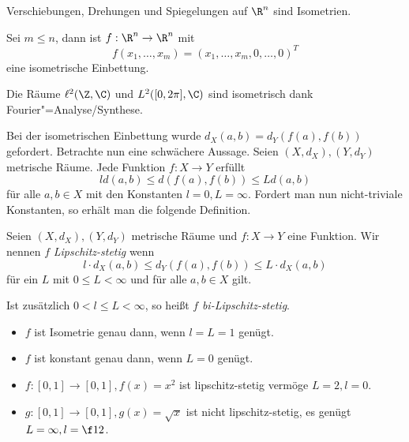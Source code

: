 \begin{ex}
	Verschiebungen, Drehungen und Spiegelungen auf $\R^n$ sind Isometrien.
\end{ex}

\begin{ex}
	Sei $m \le n$, dann ist	$f: \R^n \to \R^n$ mit
	\[
		f(x_1, \dotsc, x_m) = (x_1, \dotsc, x_m, 0, \dotsc, 0)^T
	\]
	eine isometrische Einbettung.
\end{ex}

\begin{ex}
	Die Räume $\ell^2(\Z, \C)$ und $L^2([0,2\pi], \C)$ sind isometrisch dank Fourier"=Analyse/Synthese.
\end{ex}

Bei der isometrischen Einbettung wurde $d_X(a,b) = d_Y(f(a), f(b))$ gefordert.
Betrachte nun eine schwächere Aussage.
Seien $(X,d_X), (Y,d_Y)$ metrische Räume.
Jede Funktion $f : X \to Y$ erfüllt
\[
	l d(a,b) \le d(f(a), f(b)) \le L d(a,b)
\]
für alle $a,b \in X$ mit den Konstanten $l=0, L = \infty$.
Fordert man nun nicht-triviale Konstanten, so erhält man die folgende Definition.

\begin{df}
	Seien $(X, d_X), (Y, d_Y)$ metrische Räume und $f: X \to Y$ eine Funktion.
	Wir nennen $f$ \emph{Lipschitz-stetig} wenn
	\[
		l \cdot d_X(a,b) \le d_Y(f(a), f(b)) \le L \cdot d_X(a,b)
	\]
	für ein $L$ mit $0 \le L < \infty$ und für alle $a,b \in X$ gilt.

	Ist zusätzlich $0 < l \le L < \infty$, so heißt $f$ \emph{bi-Lipschitz-stetig}.
\end{df}

\begin{ex}
	\begin{itemize}
		\item
			$f$ ist Isometrie genau dann, wenn $l=L=1$ genügt.
		\item
			$f$ ist konstant genau dann, wenn $L=0$ genügt.
	\end{itemize}
\end{ex}

\begin{ex}
	\begin{itemize}
		\item
			$f: [0,1] \to [0,1], f(x) = x^2$ ist lipschitz-stetig vermöge $L=2, l=0$.
		\item
			$g: [0,1] \to [0,1], g(x) = \sqrt{x}$ ist nicht lipschitz-stetig, es genügt $L=\infty, l=\f 12$.
	\end{itemize}
\end{ex}

